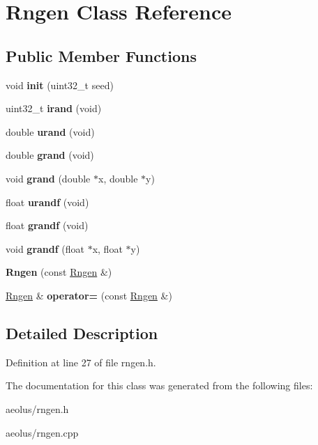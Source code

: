 \hypertarget{class_rngen}{}\section{Rngen Class Reference}
\label{class_rngen}
\subsection*{Public Member Functions}
\begin{DoxyCompactItemize}
\item 
\mbox{\label{class_rngen_a95ede2a805585567ed82fe48bb7878ac}} 
void {\bfseries init} (uint32\+\_\+t seed)
\item 
\mbox{\label{class_rngen_a0e4df870f76791cfdae3e5cc3655083a}} 
uint32\+\_\+t {\bfseries irand} (void)
\item 
\mbox{\label{class_rngen_a394593dc929a4aa2b0f23742ca553d8b}} 
double {\bfseries urand} (void)
\item 
\mbox{\label{class_rngen_aa70cf068622011a501553dc3d137d9eb}} 
double {\bfseries grand} (void)
\item 
\mbox{\label{class_rngen_ac9e0aa2c1c1b77f4d5ac7f2c594688b9}} 
void {\bfseries grand} (double $\ast$x, double $\ast$y)
\item 
\mbox{\label{class_rngen_a90c575ce3aa7508d094591ffcc0875e2}} 
float {\bfseries urandf} (void)
\item 
\mbox{\label{class_rngen_a89bfd5c20091ba5417dc87fef837791d}} 
float {\bfseries grandf} (void)
\item 
\mbox{\label{class_rngen_ab94ae284d21d18645c34849fd711294e}} 
void {\bfseries grandf} (float $\ast$x, float $\ast$y)
\item 
\mbox{\label{class_rngen_a3980a2c4941e1eff7ad239e5eec38f54}} 
{\bfseries Rngen} (const \hyperlink{class_rngen}{Rngen} \&)
\item 
\mbox{\label{class_rngen_a2b2347b4274ca340484191cc8b85cf5e}} 
\hyperlink{class_rngen}{Rngen} \& {\bfseries operator=} (const \hyperlink{class_rngen}{Rngen} \&)
\end{DoxyCompactItemize}


\subsection{Detailed Description}


Definition at line 27 of file rngen.\+h.



The documentation for this class was generated from the following files\+:\begin{DoxyCompactItemize}
\item 
aeolus/rngen.\+h\item 
aeolus/rngen.\+cpp\end{DoxyCompactItemize}
